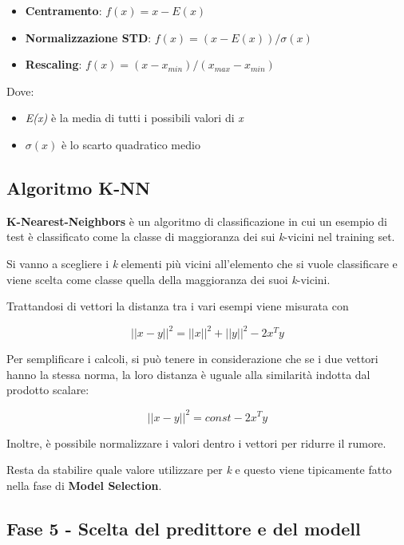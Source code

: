 \begin{itemize}
\item
  \textbf{Centramento}: $f(x) = x - E(x)$
\item
  \textbf{Normalizzazione STD}: $f(x) = (x - E(x))/\sigma(x)$
\item
  \textbf{Rescaling}: $f(x) = (x - x_{min})/(x_{max}-x_{min})$
\end{itemize}

Dove:

\begin{itemize}
\item
  \emph{E(x)} è la media di tutti i possibili valori di \emph{x}
\item
  $\sigma (x)$ è lo scarto quadratico medio
\end{itemize}

\subsection{Algoritmo K-NN}\label{algoritmo-k-nn}

\textbf{K-Nearest-Neighbors} è un algoritmo di classificazione in cui 
un esempio di test è classificato come la classe di maggioranza dei sui
\emph{k}-vicini nel training set.

Si vanno a scegliere i \emph{k} elementi più vicini all'elemento che si
vuole classificare e viene scelta come classe quella della maggioranza
dei suoi \emph{k}-vicini.

Trattandosi di vettori la distanza tra i vari esempi viene misurata con

$$ || x - y ||^2 = ||x||^2 + ||y||^2 - 2x^Ty$$


Per semplificare i calcoli, si può tenere in considerazione che se i due
vettori hanno la stessa norma, la loro distanza è uguale alla
similarità indotta dal prodotto scalare:

$$ || x - y ||^2 = const - 2x^Ty $$

Inoltre, è possibile normalizzare i valori dentro i vettori per ridurre il rumore.

Resta da stabilire quale valore utilizzare per \textit{k} e questo viene tipicamente fatto nella fase di \textbf{Model Selection}. 

\subsection{Fase 5 - Scelta del predittore e del modell}\label{fase-5---scelta-del-predittore-e-del-modell}

